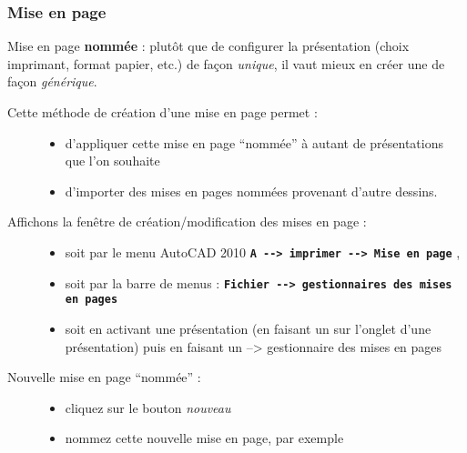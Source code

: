 \documentclass[a4paper,12pt,french]{sphinxmanual}
\begin{document}
\subsubsection{Mise en page}
\label{acad/config_acad:mise-en-page}\label{acad/config_acad:id1}
Mise en page \textbf{nommée} : plutôt que de configurer la présentation (choix imprimant, format papier, etc.) de façon \emph{unique}, il vaut mieux en créer une de façon \emph{générique}.
\begin{description}
\item[{Cette méthode de création d'une mise en page permet :}] \leavevmode\begin{itemize}
\item {} 
d'appliquer cette mise en page ``nommée'' à autant de présentations que l'on souhaite

\item {} 
d'importer des mises en pages nommées provenant d'autre dessins.

\end{itemize}

\item[{Affichons la fenêtre de création/modification des mises en page :}] \leavevmode\begin{itemize}
\item {} 
soit par le menu AutoCAD 2010 \textbf{\texttt{A -{-}\textgreater{} imprimer -{-}\textgreater{} Mise en page}} ,

\item {} 
soit par la barre de menus : \textbf{\texttt{Fichier -{-}\textgreater{} gestionnaires des mises en pages}}

\item {} 
soit en activant une présentation (en faisant un  sur l'onglet d'une présentation) puis en faisant un  --\textgreater{} gestionnaire des mises en pages

\end{itemize}

\item[{Nouvelle mise en page ``nommée'' :}] \leavevmode\begin{itemize}
\item {} 
cliquez sur le bouton \emph{nouveau}

\item {} 
nommez cette nouvelle mise en page, par exemple 

\end{itemize}


\end{description}
\end{document}
